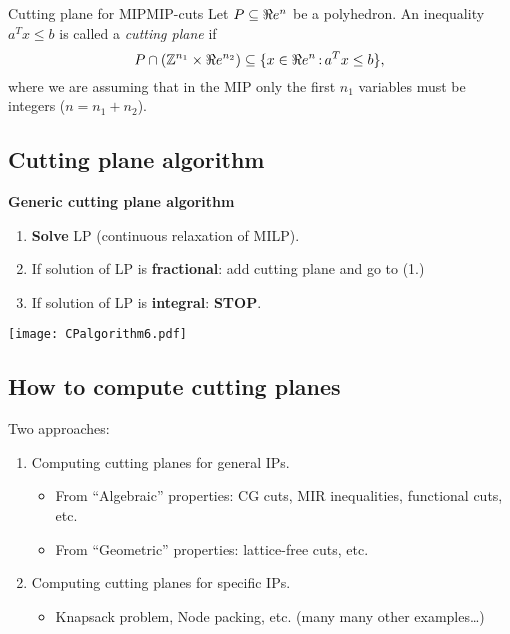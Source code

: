\begin{definition}{Cutting plane for MIP}{MIP-cuts} Let $P\subseteq\Re e^n$ be a polyhedron. An inequality $a^Tx\leq b$ is called a \emph{cutting plane} if 
$$P\cap({\mathbb{Z}}^{n_1}\times\Re e^{n_2} ) \subseteq \{x\in\Re e^n{\,:\,} a^Tx\leq b\},$$
where we are assuming that in the MIP only the first $n_1$ variables must be integers ($n=n_1+n_2$).
\end{definition}

\subsection{Cutting plane algorithm}

\begin{multicols}{2}

{\bf Generic cutting plane algorithm}

\vspace{-1cm}

\begin{enumerate}
\setlength{\itemsep}{0.01cm}
\item {\bf  Solve} LP (continuous relaxation of MILP).
\item If solution of LP is {\bf  fractional}: add cutting plane and go to (1.)
\item If solution of LP is {\bf integral}: { \bf STOP}.
\end{enumerate}

\columnbreak

\begin{center}
\texttt{[image: CPalgorithm6.pdf]}
\end{center}

\end{multicols}

\vspace{-1cm}

\subsection{How to compute cutting planes}

Two approaches:

\begin{enumerate}
	\item Computing cutting planes for general IPs.
	\begin{itemize}
		\item From ``Algebraic'' properties: CG cuts, MIR inequalities, functional cuts, etc.
		\item From ``Geometric'' properties: lattice-free cuts, etc.
	\end{itemize}
	
		\item Computing cutting planes for specific IPs.
	\begin{itemize}
		\item Knapsack problem, Node packing, etc. (many many other examples\dots)
	\end{itemize}
\end{enumerate}

